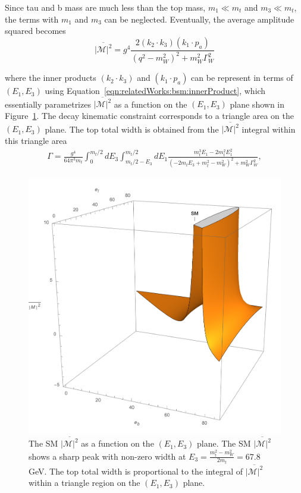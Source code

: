 \noindent Since tau and b mass are much less than the top mass, $m_1 \ll m_t $ and $m_3 \ll m_t$, the terms with $m_1$ and $m_3$ can be neglected. Eventually, the average amplitude squared becomes
\begin{equation}
	\overline{ |\mathcal{M}|^2 } =  g^4 \frac{2  (  k_2 \cdot k_3) (  k_1 \cdot p_a) }{ (  q^2-m^2_{W})^2 +  m^2_W \Gamma^2_W }  
    \label{eqn:relatedWorks:bsm:smTopDecay:smTopDecay:m2}
\end{equation}

\noindent where the inner products $(  k_2 \cdot k_3)$ and $ (  k_1 \cdot p_a) $ can be represent in terms of $(E_1,E_3)$ using Equation~\ref{eqn:relatedWorks:bsm:innerProduct}, which essentially parametrizes $\overline{ |\mathcal{M}|^2 } $ as a function on the $(E_1,E_3)$ plane shown in Figure~\ref{fig:relatedWorks:bsm:smTopDecay:smM2}. The decay kinematic constraint corresponds to a triangle area on the  $(E_1,E_3)$ plane. The top total width is obtained from the $\overline{ |\mathcal{M}|^2 } $ integral within this triangle area
\begin{equation}
    \begin{split}
         \Gamma = \frac{g^4}{64 \pi^3 m_t} \int_{0}^{m_t/2} d E_3 \int_{m_t/2-E_3}^{m_t/2} d E_1 \frac{m_t^3 E_1 - 2 m_t^2 E_1^2}{(-2 m_t E_3  + m_t^2  -m_W^2)^2 + m^2_W \Gamma^2_W},
    \end{split}
\end{equation}



\begin{figure}
\centering
    \includegraphics[width=0.4 \textwidth]{chapters/RelatedWorks/sectionBSM/figures/SM.png}
    \caption{The SM $\overline{ |\mathcal{M}|^2 } $ as a function on the $(E_1,E_3)$ plane. The SM $\overline{ |\mathcal{M}|^2 } $  shows a sharp peak with non-zero width at $E_3 = \frac{m^2_t - m^2_W}{2 m_t} = 67.8 $ GeV. The top total width is proportional to the integral of $\overline{ |\mathcal{M}|^2 } $ within a triangle region on the $(E_1,E_3)$ plane. }
    \label{fig:relatedWorks:bsm:smTopDecay:smM2}
\end{figure}







